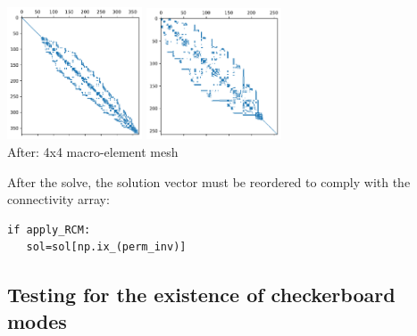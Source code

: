 \begin{center}
\includegraphics[width=4cm]{python_codes/fieldstone_78/results/spy/A_aft_topo6.pdf}
\includegraphics[width=4cm]{python_codes/fieldstone_78/results/spy/A_aft_topo7.pdf}\\
{\captionfont After: 4x4 macro-element mesh}
\end{center}

After the solve, the solution vector must be reordered to 
comply with the connectivity array:
\begin{lstlisting} 
if apply_RCM:
   sol=sol[np.ix_(perm_inv)]
\end{lstlisting} 















\newpage
\subsection*{Testing for the existence of checkerboard modes}



